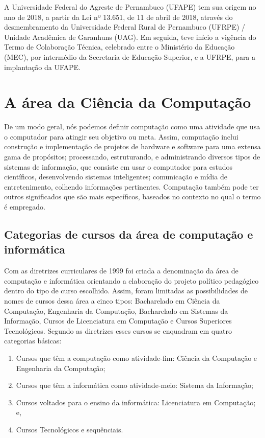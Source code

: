 \documentclass[
	12pt,				%
	openright,			%
  oneside,     %
	a4paper,			%
	english,			%
	french,				%
	spanish,			%
	brazil				%
	]{abntex2}
\begin{document}
A Universidade Federal do Agreste de Pernambuco (UFAPE) tem sua origem no ano de 2018, a partir da Lei nº 13.651, de 11 de abril de 2018, através do desmembramento da Universidade Federal Rural de Pernambuco (UFRPE) / Unidade Acadêmica de Garanhuns (UAG). Em seguida, teve início a vigência do Termo de Colaboração Técnica, celebrado entre o Ministério da Educação (MEC), por intermédio da Secretaria de Educação Superior, e a UFRPE, para a implantação da UFAPE.

\chapter{A área da Ciência da Computação}

De um modo geral, nós podemos definir computação como uma atividade que usa o
computador para atingir seu objetivo ou meta. Assim, computação inclui
construção e implementação de projetos de hardware e software para uma extensa gama de propósitos; processando, estruturando, e administrando diversos tipos de sistemas de informação, que consiste em usar o computador para estudos científicos, desenvolvendo sistemas
inteligentes; comunicação e mídia de
entretenimento, colhendo informações pertinentes. Computação também pode ter outros significados que são mais específicos, baseados no contexto no qual o termo é empregado.

\section{Categorias de cursos da área de computação e informática}

Com as diretrizes curriculares de 1999 foi criada a denominação da área de
computação e informática orientando a elaboração do projeto político pedagógico
dentro do tipo de curso escolhido. Assim, foram limitadas as possibilidades de
nomes de cursos dessa área a cinco tipos: Bacharelado em Ciência da Computação,
Engenharia da Computação, Bacharelado em Sistemas da Informação, Cursos de
Licenciatura em Computação e Cursos Superiores Tecnológicos. Segundo as
diretrizes esses cursos se enquadram em quatro categorias básicas:

\begin{enumerate}
  \item Cursos que têm a computação como atividade-fim: Ciência da Computação e
  Engenharia da Computação;
  \item Cursos que têm a informática como atividade-meio: Sistema da Informação;
  \item Cursos voltados para o ensino da informática: Licenciatura em
 Computação; e,
  \item Cursos Tecnológicos e sequênciais.
\end{enumerate}
\end{document}
